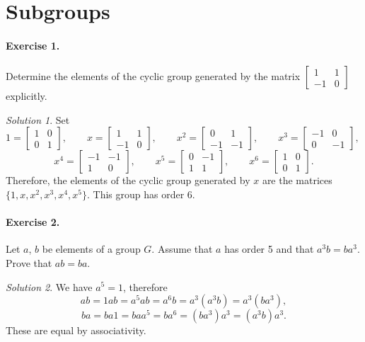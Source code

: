 \documentclass[11pt]{report}
\theoremstyle{remark}
\newtheorem*{solution}{Solution}
\begin{document}
    \section{Subgroups}
    \paragraph{Exercise 1.} Determine the elements of the cyclic group generated by
    the matrix $\begin{bmatrix}
        1 & 1 \\ -1 & 0
    \end{bmatrix}$ explicitly.
    \begin{solution}
        Set \[
            1 = \begin{bmatrix}
                1 & 0 \\ 0 & 1
            \end{bmatrix}, \qquad
            x = \begin{bmatrix}
                1 & 1 \\ -1 & 0
            \end{bmatrix}, \qquad
            x^2 = \begin{bmatrix}
                0 & 1 \\ -1 & -1
            \end{bmatrix}, \qquad
            x^3 = \begin{bmatrix}
                -1 & 0 \\ 0 & -1
            \end{bmatrix}, \qquad
        \] \[
            x^4 = \begin{bmatrix}
                -1 & -1 \\ 1 & 0
            \end{bmatrix}, \qquad
            x^5 = \begin{bmatrix}
                0 & -1 \\ 1 & 1
            \end{bmatrix}, \qquad
            x^6 = \begin{bmatrix}
                1 & 0 \\ 0 & 1
            \end{bmatrix}. 
        \] Therefore, the elements of the cyclic group generated by $x$ are the
        matrices $\{1, x, x^2, x^3, x^4, x^5\}$. This group has order 6.
    \end{solution}

    \paragraph{Exercise 2.} Let $a$, $b$ be elements of a group $G$. Assume that $a$
    has order 5 and that $a^3b = ba^3$. Prove that $ab = ba$.
    \begin{solution}
        We have $a^5 = 1$, therefore \[
            ab = 1ab = a^5ab = a^6b = a^3(a^3b) = a^3(ba^3),
        \] \[
            ba = ba1 = baa^5 = ba^6 = (ba^3)a^3 = (a^3b)a^3.
        \] These are equal by associativity.
    \end{solution}
    
\end{document}
